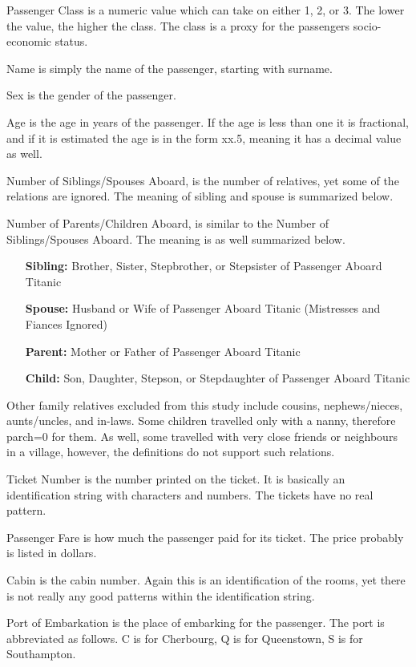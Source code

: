 \documentclass[a4paper,11pt]{article}
\begin{document}
Passenger Class is a numeric value which can take on either 1, 2, or 3. The lower the value, the higher the class. The class is a proxy for the passengers socio-economic status.

Name is simply the name of the passenger, starting with surname.

Sex is the gender of the passenger.

Age is the age in years of the passenger. If the age is less than one it is fractional, and if it is estimated the age is in the form xx.5, meaning it has a decimal value as well.

Number of Siblings/Spouses Aboard, is the number of relatives, yet some of the relations are ignored. The meaning of sibling and spouse is summarized below.

Number of Parents/Children Aboard, is similar to the Number of Siblings/Spouses Aboard. The meaning is as well summarized below.
\begin{itemize}
	\item[\textbf{Sibling:}] Brother, Sister, Stepbrother, or Stepsister of Passenger Aboard Titanic
	\item[\textbf{Spouse:}] Husband or Wife of Passenger Aboard Titanic (Mistresses and Fiances Ignored)
\item[\textbf{Parent:}] Mother or Father of Passenger Aboard Titanic
\item[\textbf{Child:}] Son, Daughter, Stepson, or Stepdaughter of Passenger Aboard Titanic
\end{itemize}

Other family relatives excluded from this study include cousins, nephews/nieces, aunts/uncles, and in-laws.  Some children travelled only with a nanny, therefore parch=0 for them.  As well, some travelled with very close friends or neighbours in a village, however, the definitions do not support such relations.

Ticket Number is the number printed on the ticket. It is basically an identification string with characters and numbers. The tickets have no real pattern.

Passenger Fare is how much the passenger paid for its ticket. The price probably is listed in dollars.

Cabin is the cabin number. Again this is an identification of the rooms, yet there is not really any good patterns within the identification string.

Port of Embarkation is the place of embarking for the passenger. The port is abbreviated as follows. C is for Cherbourg,	Q is for Queenstown, S is for Southampton.
\end{document}
